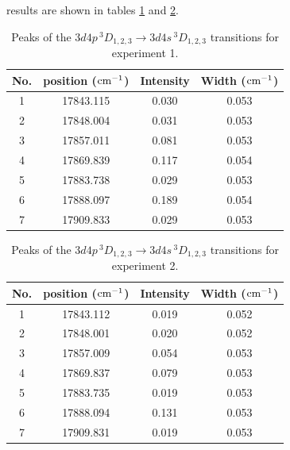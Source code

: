 \documentclass[a4paper]{article}
\begin{document}
results are shown in tables \ref{tab:transitions11} and \ref{tab:transitions12}.
\begin{table}[htb!]
\centering
\begin{tabular}{c|c|c|c}
\hline
No. & position ($\rm cm^{-1}$) & Intensity & Width ($\rm cm^{-1}$) \\
\hline
1 & 17843.115 & 0.030 & 0.053 \\
2 & 17848.004 & 0.031 & 0.053 \\
3 & 17857.011 & 0.081 & 0.053 \\
4 & 17869.839 & 0.117 & 0.054 \\
5 & 17883.738 & 0.029 & 0.053 \\
6 & 17888.097 & 0.189 & 0.054 \\
7 & 17909.833 & 0.029 & 0.053 \\
\hline
\end{tabular}
\caption{Peaks of the $3d4p\,^3D_{1,2,3} \to 3d4s\,^3D_{1,2,3}$
  transitions for experiment 1.}
\label{tab:transitions11}
\end{table}

\begin{table}[htb!]
\centering
\begin{tabular}{c|c|c|c}
\hline
No. & position ($\rm cm^{-1}$) & Intensity & Width ($\rm cm^{-1}$) \\
\hline
1 & 17843.112 & 0.019 & 0.052 \\
2 & 17848.001 & 0.020 & 0.052 \\
3 & 17857.009 & 0.054 & 0.053 \\
4 & 17869.837 & 0.079 & 0.053 \\
5 & 17883.735 & 0.019 & 0.053 \\
6 & 17888.094 & 0.131 & 0.053 \\
7 & 17909.831 & 0.019 & 0.053 \\
\hline
\end{tabular}
\caption{Peaks of the $3d4p\,^3D_{1,2,3} \to 3d4s\,^3D_{1,2,3}$
  transitions for experiment 2.}
\label{tab:transitions12}
\end{table}
\end{document}
